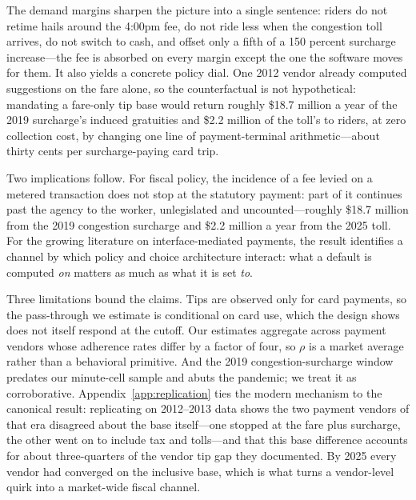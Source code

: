 The demand margins sharpen the picture into a single sentence: riders
do not retime hails around the 4:00pm fee, do not ride less when the
congestion toll arrives, do not switch to cash, and offset only a fifth
of a 150 percent surcharge increase---the fee is absorbed on every
margin except the one the software moves for them. It also yields a
concrete policy dial. One 2012 vendor already computed suggestions on
the fare alone, so the counterfactual is not hypothetical: mandating a
fare-only tip base would return roughly \$18.7 million a year of the 2019
surcharge's induced gratuities and \$2.2 million of the toll's to riders,
at zero collection cost, by changing one line of payment-terminal
arithmetic---about thirty cents per surcharge-paying card trip.

Two implications follow. For fiscal policy, the incidence of a fee
levied on a metered transaction does not stop at the statutory payment:
part of it continues past the agency to the worker, unlegislated and
uncounted---roughly \$18.7 million from the 2019 congestion surcharge and
\$2.2 million a year from the 2025 toll. For the growing literature on
interface-mediated payments, the result identifies a channel by which
policy and choice architecture interact: what a default is computed
\emph{on} matters as much as what it is set \emph{to}.

Three limitations bound the claims. Tips are observed only for card
payments, so the pass-through we estimate is conditional on card use,
which the design shows does not itself respond at the cutoff. Our
estimates aggregate across payment vendors whose adherence rates differ
by a factor of four, so $\rho$ is a market average rather than a
behavioral primitive. And the 2019 congestion-surcharge window predates
our minute-cell sample and abuts the pandemic; we treat it as
corroborative. Appendix~\ref{app:replication} ties the modern mechanism to the
canonical result: replicating \textcite{haggag2014default} on 2012--2013
data shows the two payment vendors of that era disagreed about the base
itself---one stopped at the fare plus surcharge, the other went on to
include tax and tolls---and that this base difference accounts for about
three-quarters of the vendor tip gap they documented. By 2025 every
vendor had converged on the inclusive base, which is what turns a
vendor-level quirk into a market-wide fiscal channel.
